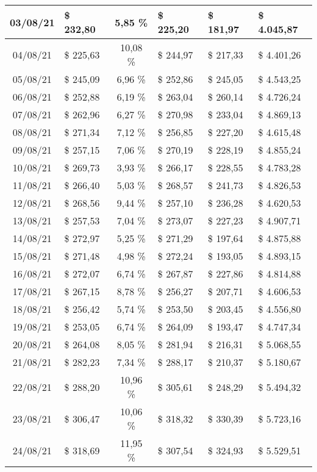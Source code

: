 \begin{center}
\begin{small}
\begin{longtable}{|c|l|c|l|l|l|}
03/08/21 & \$ 232,80 & 5,85 \% & \$ 225,20 & \$ 181,97 & \$ 4.045,87 \\ \hline
04/08/21 & \$ 225,63 & 10,08 \% & \$ 244,97 & \$ 217,33 & \$ 4.401,26 \\ \hline
05/08/21 & \$ 245,09 & 6,96 \% & \$ 252,86 & \$ 245,05 & \$ 4.543,25 \\ \hline
06/08/21 & \$ 252,88 & 6,19 \% & \$ 263,04 & \$ 260,14 & \$ 4.726,24 \\ \hline
07/08/21 & \$ 262,96 & 6,27 \% & \$ 270,98 & \$ 233,04 & \$ 4.869,13 \\ \hline
08/08/21 & \$ 271,34 & 7,12 \% & \$ 256,85 & \$ 227,20 & \$ 4.615,48 \\ \hline
09/08/21 & \$ 257,15 & 7,06 \% & \$ 270,19 & \$ 228,19 & \$ 4.855,24 \\ \hline
10/08/21 & \$ 269,73 & 3,93 \% & \$ 266,17 & \$ 228,55 & \$ 4.783,28 \\ \hline
11/08/21 & \$ 266,40 & 5,03 \% & \$ 268,57 & \$ 241,73 & \$ 4.826,53 \\ \hline
12/08/21 & \$ 268,56 & 9,44 \% & \$ 257,10 & \$ 236,28 & \$ 4.620,53 \\ \hline
13/08/21 & \$ 257,53 & 7,04 \% & \$ 273,07 & \$ 227,23 & \$ 4.907,71 \\ \hline
14/08/21 & \$ 272,97 & 5,25 \% & \$ 271,29 & \$ 197,64 & \$ 4.875,88 \\ \hline
15/08/21 & \$ 271,48 & 4,98 \% & \$ 272,24 & \$ 193,05 & \$ 4.893,15 \\ \hline
16/08/21 & \$ 272,07 & 6,74 \% & \$ 267,87 & \$ 227,86 & \$ 4.814,88 \\ \hline
17/08/21 & \$ 267,15 & 8,78 \% & \$ 256,27 & \$ 207,71 & \$ 4.606,53 \\ \hline
18/08/21 & \$ 256,42 & 5,74 \% & \$ 253,50 & \$ 203,45 & \$ 4.556,80 \\ \hline
19/08/21 & \$ 253,05 & 6,74 \% & \$ 264,09 & \$ 193,47 & \$ 4.747,34 \\ \hline
20/08/21 & \$ 264,08 & 8,05 \% & \$ 281,94 & \$ 216,31 & \$ 5.068,55 \\ \hline
21/08/21 & \$ 282,23 & 7,34 \% & \$ 288,17 & \$ 210,37 & \$ 5.180,67 \\ \hline
22/08/21 & \$ 288,20 & 10,96 \% & \$ 305,61 & \$ 248,29 & \$ 5.494,32 \\ \hline
23/08/21 & \$ 306,47 & 10,06 \% & \$ 318,32 & \$ 330,39 & \$ 5.723,16 \\ \hline
24/08/21 & \$ 318,69 & 11,95 \% & \$ 307,54 & \$ 324,93 & \$ 5.529,51 \\ \hline

\end{longtable}
\end{small}
\end{center}
